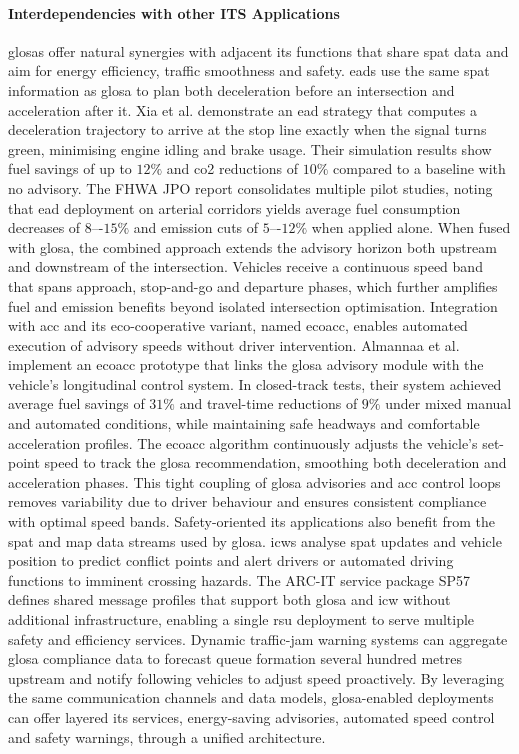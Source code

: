 \paragraph{Interdependencies with other ITS Applications}

\acp{glosa} offer natural synergies with adjacent \ac{its} functions that share \ac{spat} data and aim for energy efficiency, traffic smoothness and safety. \acp{ead} use the same \ac{spat} information as \ac{glosa} to plan both deceleration before an intersection and acceleration after it. Xia et al. \cite{Xia2014} demonstrate an \ac{ead} strategy that computes a deceleration trajectory to arrive at the stop line exactly when the signal turns green, minimising engine idling and brake usage. Their simulation results show fuel savings of up to $12\%$ and \ac{co2} reductions of $10\%$ compared to a baseline with no advisory. The FHWA JPO report \cite{FHWA2016} consolidates multiple pilot studies, noting that \ac{ead} deployment on arterial corridors yields average fuel consumption decreases of $8$–-$15\%$ and emission cuts of $5$–-$12\%$ when applied alone. When fused with \ac{glosa}, the combined approach extends the advisory horizon both upstream and downstream of the intersection. Vehicles receive a continuous speed band that spans approach, stop-and-go and departure phases, which further amplifies fuel and emission benefits beyond isolated intersection optimisation.
\mynewline
Integration with \ac{acc} and its eco-cooperative variant, named \ac{ecoacc}, enables automated execution of advisory speeds without driver intervention. Almannaa et al. \cite{Almannaa2019} implement an \ac{ecoacc} prototype that links the \ac{glosa} advisory module with the vehicle’s longitudinal control system. In closed-track tests, their system achieved average fuel savings of $31\%$ and travel-time reductions of $9\%$ under mixed manual and automated conditions, while maintaining safe headways and comfortable acceleration profiles. The \ac{ecoacc} algorithm continuously adjusts the vehicle’s set-point speed to track the \ac{glosa} recommendation, smoothing both deceleration and acceleration phases. This tight coupling of \ac{glosa} advisories and \ac{acc} control loops removes variability due to driver behaviour and ensures consistent compliance with optimal speed bands.
\mynewline
Safety-oriented \ac{its} applications also benefit from the \ac{spat} and \ac{map} data streams used by \ac{glosa}. \acp{icw} analyse \ac{spat} updates and vehicle position to predict conflict points and alert drivers or automated driving functions to imminent crossing hazards. The ARC-IT service package SP57 defines shared message profiles that support both \ac{glosa} and \ac{icw} without additional infrastructure, enabling a single \ac{rsu} deployment to serve multiple safety and efficiency services. \cite{ARCITSP57} Dynamic traffic-jam warning systems can aggregate \ac{glosa} compliance data to forecast queue formation several hundred metres upstream and notify following vehicles to adjust speed proactively. By leveraging the same communication channels and data models, \ac{glosa}-enabled deployments can offer layered \ac{its} services, energy-saving advisories, automated speed control and safety warnings, through a unified architecture.
